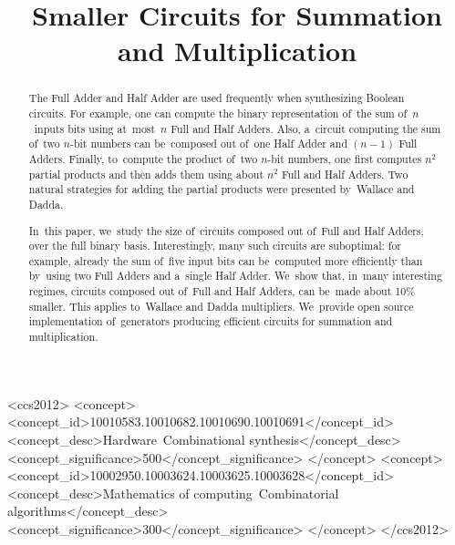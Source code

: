 \documentclass[sigconf, review, anonymous]{acmart}
\begin{document}
\begin{CCSXML}
	<ccs2012>
	<concept>
	<concept_id>10010583.10010682.10010690.10010691</concept_id>
	<concept_desc>Hardware~Combinational synthesis</concept_desc>
	<concept_significance>500</concept_significance>
	</concept>
	<concept>
	<concept_id>10002950.10003624.10003625.10003628</concept_id>
	<concept_desc>Mathematics of computing~Combinatorial algorithms</concept_desc>
	<concept_significance>300</concept_significance>
	</concept>
	</ccs2012>
\end{CCSXML}



\title{Smaller Circuits for Summation and Multiplication}




\begin{abstract}
	The Full Adder and Half Adder are used frequently when synthesizing Boolean circuits.
	For example, one can compute the binary representation of~the sum of~$n$~inputs bits
	using at~most~$n$ Full and Half Adders. Also, a~circuit computing the sum of~two $n$-bit
	numbers can be~composed out of~one Half Adder and $(n-1)$ Full Adders. Finally,
	to~compute the product of~two $n$-bit numbers, one first computes $n^2$ partial products
	and then adds them using about $n^2$ Full and Half Adders. Two natural strategies for
	adding the partial products were presented by~Wallace and Dadda.

	In~this paper, we~study the size of~circuits composed out of~Full and Half Adders,
	over the full binary basis. Interestingly, many such circuits are suboptimal:
	for example, already the sum of~five input bits can be~computed more efficiently
	than by~using two Full Adders and a~single Half Adder. We~show that, in~many interesting
	regimes, circuits composed out of~Full and Half Adders, can be~made about 10\% smaller.
	This applies to~Wallace and Dadda multipliers.
	We~provide open source implementation of~generators producing efficient
	circuits for summation and multiplication.
\end{abstract}


\maketitle
\end{document}
